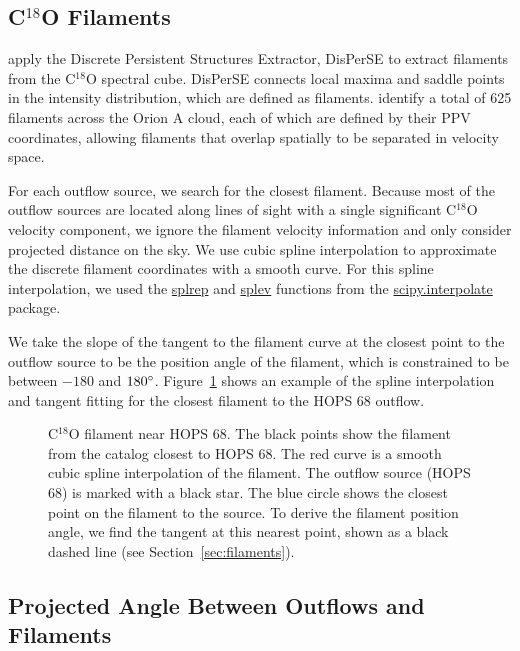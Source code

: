 \documentclass[twocolumn]{aastex63}
\newcommand{\example}{HOPS 68}
\begin{document}
\subsection{C$^{18}$O Filaments}
\citet{Suri19} apply the Discrete Persistent Structures Extractor, DisPerSE \citep{Sousbie11} to extract filaments from the C$^{18}$O spectral cube. DisPerSE connects local maxima and saddle points in the intensity distribution, which are defined as filaments. \citet{Suri19} identify a total of 625 filaments across the Orion A cloud, each of which are defined by their PPV coordinates, allowing filaments that overlap spatially to be separated in velocity space. 

For each outflow source, we search for the closest filament. Because most of the outflow sources are located along lines of sight with a single significant C$^{18}$O velocity component, we ignore the filament velocity information and only consider projected distance on the sky. We use cubic spline interpolation to approximate the discrete filament coordinates with a smooth curve. For this spline interpolation, we used the \url{splrep} and \url{splev} functions from the \url{scipy.interpolate} package. %

We take the slope of the tangent to the filament curve at the closest point to the outflow source to be the position angle of the filament, which is constrained to be between $-180$ and $180\mbox{$^\circ$}$. Figure~\ref{fig:filament} shows an example of the spline interpolation and tangent fitting for the closest filament to the \example{} outflow.

\begin{figure}
\caption{C$^{18}$O filament near \example{}. The black points show the filament from the \citet{Suri19} catalog closest to \example{}. The red curve is a smooth cubic spline interpolation of the filament. The outflow source (\example{}) is marked with a black star. The blue circle shows the closest point on the filament to the source. To derive the filament position angle, we find the tangent at this nearest point, shown as a black dashed line (see Section~\ref{sec:filaments}).\label{fig:filament}}
\end{figure}

\subsection{Projected Angle Between Outflows and Filaments}\label{sec:gamma}
\end{document}
